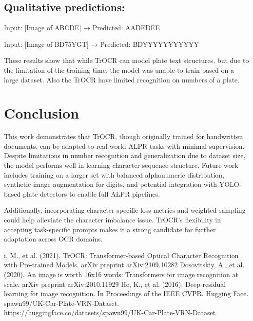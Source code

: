 \documentclass[conference]{IEEEtran}
\begin{document}
\subsection{Qualitative predictions:}\label{AA}
Input: [Image of ABCDE] → Predicted: AADEDEE

Input: [Image of BD75YGT] → Predicted: BDYYYYYYYYYYY

These results show that while TrOCR can model plate text structures, but due to the limitation of the training time, the model was unable to train based on a large dataset. Also the TrOCR have limited recognition on numbers of a plate.

\section{Conclusion}
This work demonstrates that TrOCR, though originally trained for handwritten documents, can be adapted to real-world ALPR tasks with minimal supervision. Despite limitations in number recognition and generalization due to dataset size, the model performs well in learning character sequence structure. Future work includes training on a larger set with balanced alphanumeric distribution, synthetic image augmentation for digits, and potential integration with YOLO-based plate detectors to enable full ALPR pipelines.

Additionally, incorporating character-specific loss metrics and weighted sampling could help alleviate the character imbalance issue. TrOCR's flexibility in accepting task-specific prompts makes it a strong candidate for further adaptation across OCR domains.






\begin{thebibliography}{00}
 i, M., et al. (2021). TrOCR: Transformer-based Optical Character Recognition with Pre-trained Models. arXiv preprint arXiv:2109.10282
  Dosovitskiy, A., et al. (2020). An image is worth 16x16 words: Transformers for image recognition at scale. arXiv preprint arXiv:2010.11929
 He, K., et al. (2016). Deep residual learning for image recognition. In Proceedings of the IEEE CVPR.
 Hugging Face. spawn99/UK-Car-Plate-VRN-Dataset. https://huggingface.co/datasets/spawn99/UK-Car-Plate-VRN-Dataset

\end{thebibliography}
\vspace{12pt}
\end{document}
